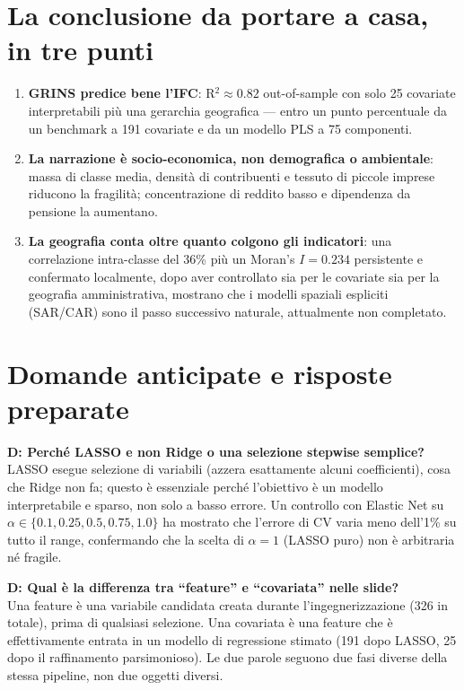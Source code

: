 \documentclass[11pt,a4paper]{article}
\begin{document}
\section{La conclusione da portare a casa, in tre punti}

\begin{enumerate}[leftmargin=2em]
  \item \textbf{GRINS predice bene l'IFC}: R$^2 \approx 0.82$
  out-of-sample con solo 25 covariate interpretabili più una
  gerarchia geografica --- entro un punto percentuale da un
  benchmark a 191 covariate e da un modello PLS a 75 componenti.
  \item \textbf{La narrazione è socio-economica, non demografica o
  ambientale}: massa di classe media, densità di contribuenti e
  tessuto di piccole imprese riducono la fragilità; concentrazione
  di reddito basso e dipendenza da pensione la aumentano.
  \item \textbf{La geografia conta oltre quanto colgono gli
  indicatori}: una correlazione intra-classe del 36\% più un
  Moran's $I = 0.234$ persistente e confermato localmente, dopo aver
  controllato sia per le covariate sia per la geografia
  amministrativa, mostrano che i modelli spaziali espliciti
  (SAR/CAR) sono il passo successivo naturale, attualmente non
  completato.
\end{enumerate}

\section{Domande anticipate e risposte preparate}

\textbf{D: Perché LASSO e non Ridge o una selezione stepwise
semplice?}\\
LASSO esegue selezione di variabili (azzera esattamente alcuni
coefficienti), cosa che Ridge non fa; questo è essenziale perché
l'obiettivo è un modello interpretabile e sparso, non solo a basso
errore. Un controllo con Elastic Net su $\alpha \in \{0.1, 0.25,
0.5, 0.75, 1.0\}$ ha mostrato che l'errore di CV varia meno
dell'1\% su tutto il range, confermando che la scelta di
$\alpha=1$ (LASSO puro) non è arbitraria né fragile.

\textbf{D: Qual è la differenza tra ``feature'' e ``covariata'' nelle
slide?}\\
Una feature è una variabile candidata creata durante l'ingegnerizzazione
(326 in totale), prima di qualsiasi selezione. Una covariata è una
feature che è effettivamente entrata in un modello di regressione
stimato (191 dopo LASSO, 25 dopo il raffinamento parsimonioso). Le
due parole seguono due fasi diverse della stessa pipeline, non due
oggetti diversi.
\end{document}

